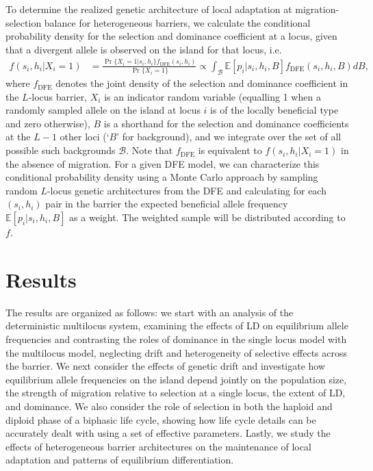 \documentclass[
  11pt,
]{article}
\begin{document}
To determine the realized genetic architecture of local adaptation at
migration-selection balance for heterogeneous barriers, we calculate the
conditional probability density for the selection and dominance
coefficient at a locus, given that a divergent allele is observed on the
island for that locus, i.e. \begin{align}
  f(s_i,h_i|X_i=1) 
  &= \frac{\Pr\{X_i=1|s_i,h_i\}f_{\mathrm{DFE}}(s_i,h_i)}{\Pr\{X_i=1\}} 
  \propto \int_\mathcal{B} \mathbb{E}[p_i|s_i,h_i,B]f_{\mathrm{DFE}}(s_i,h_i,B)dB,
  \label{eq:msbdfe}
\end{align} where \(f_\text{DFE}\) denotes the joint density of the
selection and dominance coefficient in the \(L\)-locus barrier, \(X_i\)
is an indicator random variable (equalling 1 when a randomly sampled
allele on the island at locus \(i\) is of the locally beneficial type
and zero otherwise), \(B\) is a shorthand for the selection and
dominance coefficients at the \(L-1\) other loci (`\(B\)' for
background), and we integrate over the set of all possible such
backgrounds \(\mathcal{B}\). Note that \(f_\text{DFE}\) is equivalent to
\(f(s_i,h_i|X_i=1)\) in the absence of migration. For a given DFE model,
we can characterize this conditional probability density using a Monte
Carlo approach by sampling random \(L\)-locus genetic architectures from
the DFE and calculating for each \((s_i,h_i)\) pair in the barrier the
expected beneficial allele frequency \(\mathbb{E}[p_i|s_i,h_i,B]\) as a
weight. The weighted sample will be distributed according to \(f\).

\hypertarget{results}{%
\section{Results}\label{results}}

The results are organized as follows: we start with an analysis of the
deterministic multilocus system, examining the effects of LD on
equilibrium allele frequencies and contrasting the roles of dominance in
the single locus model with the multilocus model, neglecting drift and
heterogeneity of selective effects across the barrier. We next consider
the effects of genetic drift and investigate how equilibrium allele
frequencies on the island depend jointly on the population size, the
strength of migration relative to selection at a single locus, the
extent of LD, and dominance. We also consider the role of selection in
both the haploid and diploid phase of a biphasic life cycle, showing how
life cycle details can be accurately dealt with using a set of effective
parameters. Lastly, we study the effects of heterogeneous barrier
architectures on the maintenance of local adaptation and patterns of
equilibrium differentiation.
\end{document}
